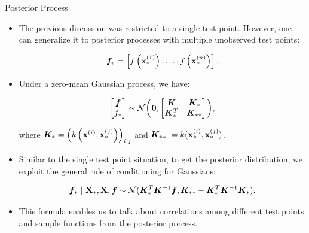 \begin{frame}[c,allowframebreaks]{Posterior Process}

\begin{itemize}
\item The previous discussion was restricted to a single test point. However, one can generalize it to posterior processes with multiple unobserved test points:
  
$$\bm{f}_* = \left[f\left(\mathbf{x}^{(1)}_*\right),\dots, f\left(\mathbf{x}^{(n)}_*\right)\right].$$ 


\lz

\item Under a zero-mean Gaussian process, we have:

$$\begin{bmatrix}\bm{f} \\
f_*\end{bmatrix}\sim  
\mathcal{N}\biggl(\bm{0}, \begin{bmatrix} \bm{K} & \bm{K}_* \\ \bm{K}_*^T & \bm{K}_{**}\end{bmatrix}\biggr),$$

where $\bm{K}_* = \left(k\left(\mathbf{x}^{(i)}, \mathbf{x}^{(j)}_*\right)\right)_{i,j}$ and $ \bm{K}_{**}\ = k(\mathbf{x}^{(i)}_*, \mathbf{x}^{(j)}_*)$.

\end{itemize}

\framebreak

\begin{itemize}

  \item[\faLightbulbO] Similar to the single test point situation, to get the posterior distribution, we exploit the general rule of conditioning for Gaussians:
  
  \begin{eqnarray*}
    \bm{f}_* ~|~ \mathbf{X}_*, \mathbf{X}, \bm{f} \sim \mathcal{N}(\bm{K}_{*}^{T}\bm{K}^{-1}\bm{f}, \bm{K}_{**} - \bm{K}_*^T \bm{K} ^{-1}\bm{K}_*).
  \end{eqnarray*}  
  
\lz

  \item[\faLightbulbO] This formula enables us to talk about correlations among different test points and sample functions from the posterior process. 
\end{itemize}


\end{frame}

